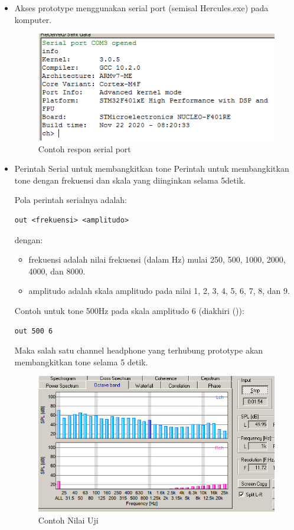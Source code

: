 \documentclass[12pt,]{article}
\begin{document}
\begin{itemize}
		\item Akses prototype menggunakan serial port (semisal Hercules.exe) pada komputer.
		\begin{figure}[!ht]
			\centering
			\includegraphics[width=300pt]{images/terminal/hercules_text}
			\caption{Contoh respon serial port}
		\end{figure}

		\item Perintah Serial untuk membangkitkan tone
		Perintah untuk membangkitkan tone dengan frekuensi dan skala yang diinginkan selama 5detik.

		Pola perintah serialnya adalah:
		\begin{verbatim}
out <frekuensi> <amplitudo>
		\end{verbatim}

		dengan:
		\begin{itemize}

			\item frekuensi adalah nilai frekuensi (dalam Hz) mulai 250, 500, 1000, 2000, 4000, dan 8000.

			\item amplitudo adalah skala amplitudo pada nilai 1, 2, 3, 4, 5, 6, 7, 8, dan 9.

		\end{itemize}

		Contoh untuk tone 500Hz pada skala amplitudo 6 (diakhiri (\keys{\return})):
		\begin{verbatim}
out 500 6
		\end{verbatim}

		\newpage
		Maka salah satu channel headphone yang terhubung prototype akan membangkitkan tone selama 5 detik.

		\begin{figure}[!ht]
			\centering
			\includegraphics[width=300pt]{images/terminal/contoh}
			\caption{Contoh Nilai Uji}
		\end{figure}


\end{itemize}
\end{document}
